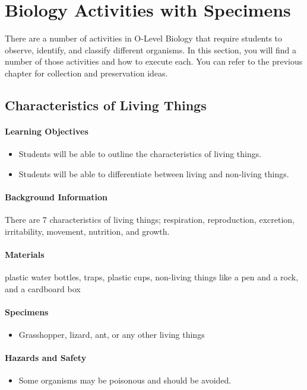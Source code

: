 \chapter{Biology Activities with Specimens}
There are a number of activities in O-Level Biology that require students to observe, identify, and classify different organisms. In this section, you will find a number of those activities and how to execute each. You can refer to the previous chapter for collection and preservation ideas.

\section{Characteristics of Living Things}

\subsubsection*{Learning Objectives}
\begin{itemize}
\item{Students will be able to outline the characteristics of living things.}
\item{Students will be able to differentiate between living and non-living things.}
\end{itemize}

\subsubsection*{Background Information}
There are 7 characteristics of living things; respiration, reproduction, excretion, irritability, movement, nutrition, and growth.

\subsubsection*{Materials}
plastic water bottles, traps, plastic cups, non-living things like a pen and a rock, and a cardboard box

\subsubsection*{Specimens}
\begin{itemize}
\item{Grasshopper, lizard, ant, or any other living things}
\end{itemize}

\subsubsection*{Hazards and Safety}
\begin{itemize}
\item{Some organisms may be poisonous and should be avoided.}
\end{itemize}

